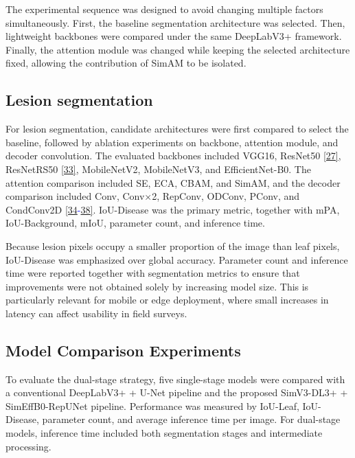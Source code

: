 \documentclass[
]{article}
\begin{document}
The experimental sequence was designed to avoid changing multiple
factors simultaneously. First, the baseline segmentation architecture was
selected. Then, lightweight backbones were compared under the same
DeepLabV3+ framework. Finally, the attention module was changed while
keeping the selected architecture fixed, allowing the contribution of
SimAM to be isolated.

\hypertarget{lesion-segmentation}{%
\subsection{Lesion segmentation}\label{lesion-segmentation}}

For lesion segmentation, candidate architectures were first compared to
select the baseline, followed by ablation experiments on backbone,
attention module, and decoder convolution. The evaluated backbones
included VGG16, ResNet50 \textcolor{blue}{\hyperlink{ref:27}{[27]}},
ResNetRS50 \textcolor{blue}{\hyperlink{ref:33}{[33]}}, MobileNetV2,
MobileNetV3, and
EfficientNet-B0. The attention comparison included SE, ECA, CBAM, and
SimAM, and the decoder comparison included Conv, Conv×2, RepConv, ODConv,
PConv, and CondConv2D \textcolor{blue}{\hyperlink{ref:34}{[34}-\hyperlink{ref:38}{38]}}.
IoU-Disease was the primary metric, together with
mPA, IoU-Background, mIoU, parameter count, and inference time.

Because lesion pixels occupy a smaller proportion of the image than leaf
pixels, IoU-Disease was emphasized over global accuracy. Parameter count
and inference time were reported together with segmentation metrics to
ensure that improvements were not obtained solely by increasing model
size. This is particularly relevant for mobile or edge deployment, where
small increases in latency can affect usability in field surveys.

\hypertarget{model-comparison-experiments}{%
\subsection{Model Comparison
Experiments}\label{model-comparison-experiments}}

To evaluate the dual-stage strategy, five single-stage models were
compared with a conventional DeepLabV3+ + U-Net pipeline and the proposed
SimV3-DL3+ + SimEffB0-RepUNet pipeline. Performance was measured by
IoU-Leaf, IoU-Disease, parameter count, and average inference time per
image. For dual-stage models, inference time included both segmentation
stages and intermediate processing.
\end{document}

